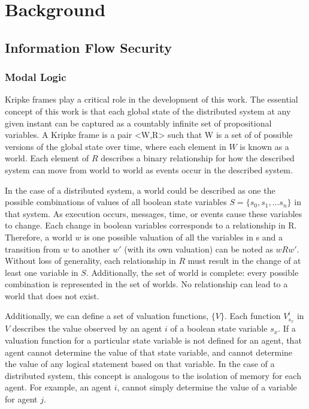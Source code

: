 \section{Background}

\subsection{Information Flow Security}

\subsubsection{Modal Logic}

Kripke frames play a critical role in the development of this work. The essential concept of this work is that each global state of the distributed system at any given instant can be captured as a countably infinite set of propositional variables. A Kripke frame is a pair <W,R> such that W is a set of of possible versions of the global state over time, where each element in $W$ is known as a world. Each element of $R$ describes a binary relationship for how the described system can move from world to world as events occur in the described system.

In the case of a distributed system, a world could be described as one the possible combinations of values of all boolean state variables $S=\{s_0, s_1, ... s_n\}$ in that system. As execution occurs, messages, time, or events cause these variables to change. Each change in boolean variables corresponds to a relationship in R. Therefore, a world $w$ is one possible valuation of all the variables in s and a transition from $w$ to another $w'$ (with its own valuation) can be noted as $wRw'$. Without loss of generality, each relationship in $R$ must result in the change of at least one variable in $S$. Additionally, the set of world is complete: every possible combination is represented in the set of worlds. No relationship can lead to a world that does not exist.

Additionally, we can define a set of valuation functions, $\{V\}$. Each function $V^i_{s_x}$ in $V$ describes the value observed by an agent $i$ of a boolean state variable $s_x$.  If a valuation function for a particular state variable is not defined for an agent, that agent cannot determine the value of that state variable, and cannot determine the value of any logical statement based on that variable. In the case of a distributed system, this concept is analogous to the isolation of memory for each agent. For example, an agent $i$, cannot simply determine the value of a variable for agent $j$.

